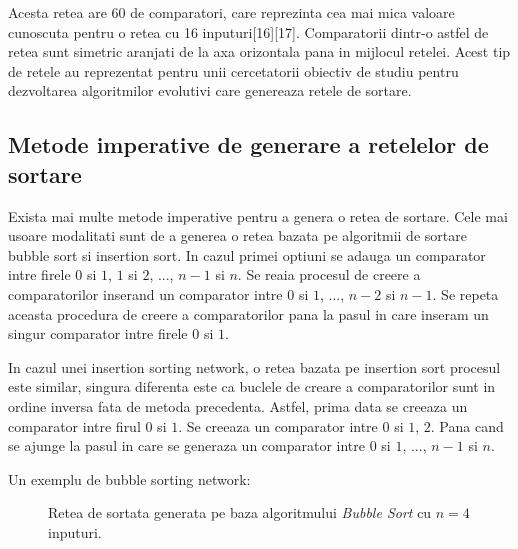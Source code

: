 \documentclass[12pt]{article}
\begin{document}
Acesta retea are $60$ de comparatori, care reprezinta cea mai mica valoare cunoscuta pentru o retea cu 16 inputuri[16][17]. Comparatorii dintr-o astfel de retea sunt simetric aranjati de la axa orizontala pana in mijlocul retelei. Acest tip de retele au reprezentat pentru unii cercetatorii obiectiv de studiu pentru dezvoltarea algoritmilor evolutivi care genereaza retele de sortare. 

\subsection{Metode imperative de generare a retelelor de sortare}

Exista mai multe metode imperative pentru a genera o retea de sortare. Cele mai usoare modalitati sunt de a generea o 
retea bazata pe algoritmii de sortare bubble sort si insertion sort. In cazul primei optiuni se adauga un comparator intre
firele $0$ si $1$, $1$ si $2$, ..., $n-1$ si $n$. Se reaia procesul de creere a comparatorilor inserand un comparator intre $0$ si $1$, ..., $n-2$ si $n-1$. Se repeta aceasta procedura de creere a comparatorilor pana la pasul in care inseram un singur comparator intre firele $0$ si $1$.

In cazul unei insertion sorting network, o retea bazata pe insertion sort procesul este similar, singura diferenta este ca buclele de creare a comparatorilor sunt in ordine inversa fata de metoda precedenta. Astfel, prima data se creeaza un comparator 
intre firul $0$ si $1$. Se creeaza un comparator intre $0$ si $1$, $2$. Pana cand se ajunge la pasul in care se generaza un comparator intre $0$ si $1$, ..., $n-1$ si $n$. 

Un exemplu de bubble sorting network:

\begin{figure}
\centering
{}
\caption{Retea de sortata generata pe baza algoritmului \textit{Bubble Sort} cu $n=4$ inputuri. }
\end{figure}
\end{document}
